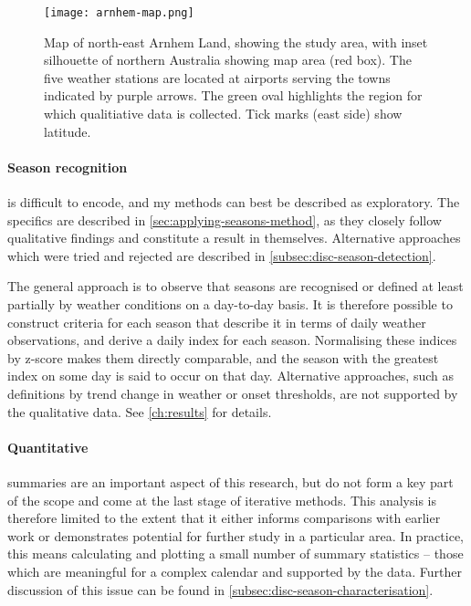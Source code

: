 \begin{figure}[t]
    \centering
    \texttt{[image: arnhem-map.png]}
    \caption[Map of north-east Arnhem Land, showing the study area]{
        Map of north-east Arnhem Land, showing the study area, with inset silhouette
        of northern Australia showing map area (red box).  The five weather
        stations are located at airports serving the towns indicated by purple
        arrows.  The green oval highlights the region for which qualitiative
        data is collected.  Tick marks (east side) show latitude.}
    \label{fig:arnhem-map}
\end{figure}



\paragraph{Season recognition} is difficult to encode, and my methods can
best be described as exploratory.  The specifics are described in
\cref{sec:applying-seasons-method}, as they closely follow qualitative
findings and constitute a result in themselves.  Alternative approaches
which were tried and rejected are described in \cref{subsec:disc-season-detection}.

The general approach is to observe that seasons are recognised or defined
at least partially by weather conditions on a day-to-day basis.  It is
therefore possible to construct criteria for each season that describe
it in terms of daily weather observations, and derive a daily index for
each season.  Normalising these indices by z-score makes them directly
comparable, and the season with the greatest index on some day is said
to occur on that day.
%
Alternative approaches, such as definitions by trend change in weather
or onset thresholds, are not supported by the qualitative data.  See
\cref{ch:results} for details.


\paragraph{Quantitative} summaries are an important aspect of this
research, but do not form a key part of the scope and come at the
last stage of iterative methods.  This analysis is therefore
limited to the extent that it either informs comparisons with earlier work
or demonstrates potential for further study in a particular area.
In practice, this means calculating and plotting a small number of summary statistics
-- those which are meaningful for a complex calendar and supported by the
data.  Further discussion of this issue can be found in
\cref{subsec:disc-season-characterisation}.



